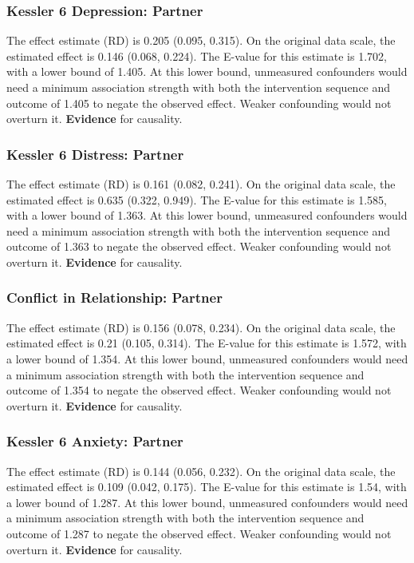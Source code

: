 \documentclass[
  singlecolumn]{article}
\begin{document}
\subsubsection{Kessler 6 Depression:
Partner}\label{kessler-6-depression-partner-17}

The effect estimate (RD) is 0.205 (0.095, 0.315). On the original data
scale, the estimated effect is 0.146 (0.068, 0.224). The E-value for
this estimate is 1.702, with a lower bound of 1.405. At this lower
bound, unmeasured confounders would need a minimum association strength
with both the intervention sequence and outcome of 1.405 to negate the
observed effect. Weaker confounding would not overturn it.
\textbf{Evidence} for causality.

\subsubsection{Kessler 6 Distress:
Partner}\label{kessler-6-distress-partner-17}

The effect estimate (RD) is 0.161 (0.082, 0.241). On the original data
scale, the estimated effect is 0.635 (0.322, 0.949). The E-value for
this estimate is 1.585, with a lower bound of 1.363. At this lower
bound, unmeasured confounders would need a minimum association strength
with both the intervention sequence and outcome of 1.363 to negate the
observed effect. Weaker confounding would not overturn it.
\textbf{Evidence} for causality.

\subsubsection{Conflict in Relationship:
Partner}\label{conflict-in-relationship-partner-17}

The effect estimate (RD) is 0.156 (0.078, 0.234). On the original data
scale, the estimated effect is 0.21 (0.105, 0.314). The E-value for this
estimate is 1.572, with a lower bound of 1.354. At this lower bound,
unmeasured confounders would need a minimum association strength with
both the intervention sequence and outcome of 1.354 to negate the
observed effect. Weaker confounding would not overturn it.
\textbf{Evidence} for causality.

\subsubsection{Kessler 6 Anxiety:
Partner}\label{kessler-6-anxiety-partner-17}

The effect estimate (RD) is 0.144 (0.056, 0.232). On the original data
scale, the estimated effect is 0.109 (0.042, 0.175). The E-value for
this estimate is 1.54, with a lower bound of 1.287. At this lower bound,
unmeasured confounders would need a minimum association strength with
both the intervention sequence and outcome of 1.287 to negate the
observed effect. Weaker confounding would not overturn it.
\textbf{Evidence} for causality.
\end{document}
